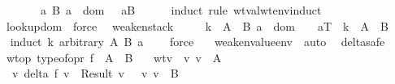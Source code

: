 \begin{isabellebody}
\ \ \ {\isasymand}\ {\isacharparenleft}{\isasymGamma}{\isacharsemicolon}{\isasymSigma}\ {\isasymturnstile}\ {\isasymrho}\ {\isasymlongrightarrow}\ {\isacharparenleft}{\isasymforall}\ a\ B{\isachardot}\ a\ {\isasymnotin}\ dom\ {\isasymSigma}\ {\isasymlongrightarrow}\ {\isasymGamma}{\isacharsemicolon}{\isacharparenleft}a{\isacharcomma}B{\isacharparenright}{\isacharhash}{\isasymSigma}\ {\isasymturnstile}\ {\isasymrho}{\isacharparenright}{\isacharparenright}{\isachardoublequoteclose}\isanewline
\isadelimproof
\ \ \endisadelimproof
\isatagproof
{}\isamarkupfalse \ {\isacharparenleft}induct\ rule{\isacharcolon}\ wt{\isacharunderscore}val{\isacharunderscore}wt{\isacharunderscore}env{\isachardot}induct{\isacharparenright}\isanewline
\ \ \isamarkupfalse \ lookup{\isacharunderscore}dom\ \isamarkupfalse \ force{\isacharplus}\ \isamarkupfalse \endisatagproof
{\isafoldproof}\isadelimproof
\isanewline
\endisadelimproof
\isanewline
{}\isamarkupfalse \ weaken{\isacharunderscore}stack{\isacharcolon}\isanewline
\ \ {\isachardoublequoteopen}{\isasymlbrakk}\ {\isasymSigma}\ {\isasymturnstile}\ k\ {\isacharcolon}\ A\ {\isasymRightarrow}\ B{\isacharsemicolon}\ a\ {\isasymnotin}\ dom\ {\isasymSigma}\ {\isasymrbrakk}\ {\isasymLongrightarrow}\ {\isacharparenleft}a{\isacharcomma}T{\isacharparenright}{\isacharhash}{\isasymSigma}\ {\isasymturnstile}\ k\ {\isacharcolon}\ A\ {\isasymRightarrow}\ B{\isachardoublequoteclose}\isanewline
\isadelimproof
\ \ \endisadelimproof
\isatagproof
{}\isamarkupfalse \ {\isacharparenleft}induct\ k\ arbitrary{\isacharcolon}\ A\ B\ a\ {\isasymSigma}{\isacharparenright}\isanewline
\ \ \isamarkupfalse \ force\isanewline
\ \ \isamarkupfalse \ weaken{\isacharunderscore}value{\isacharunderscore}env\ \isamarkupfalse \ auto\ \isamarkupfalse \endisatagproof
{\isafoldproof}\isadelimproof
\isanewline
\endisadelimproof
\isanewline
{}\isamarkupfalse \ delta{\isacharunderscore}safe{\isacharcolon}\ \isanewline
\ \ \ wtop{\isacharcolon}\ {\isachardoublequoteopen}typeof{\isacharunderscore}opr\ f\ {\isacharequal}\ A\ {\isasymrightarrow}\ B{\isachardoublequoteclose}\isanewline
\ \ \ wtv{\isacharcolon}\ {\isachardoublequoteopen}{\isasymSigma}\ {\isasymturnstile}v\ v\ {\isacharcolon}\ A{\isachardoublequoteclose}\isanewline
\ \ \ {\isachardoublequoteopen}{\isasymexists}\ v{\isacharprime}{\isachardot}\ delta\ f\ v\ {\isacharequal}\ Result\ v{\isacharprime}\ {\isasymand}\ {\isasymSigma}\ {\isasymturnstile}v\ v{\isacharprime}\ {\isacharcolon}\ B{\isachardoublequoteclose}\isanewline

\end{isabellebody}
